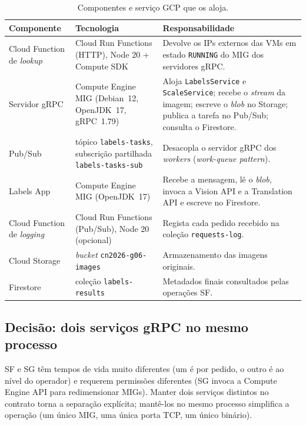 \documentclass[11pt,a4paper]{article}
\begin{document}
\begin{table}[h]
\centering
\small
\begin{tabular}{@{}p{36mm}p{40mm}p{70mm}@{}}
\toprule
Componente & Tecnologia & Responsabilidade \\
\midrule
Cloud Function de \emph{lookup}    & Cloud Run Functions (HTTP), Node 20 + Compute SDK & Devolve os IPs externos das VMs em estado \texttt{RUNNING} do MIG dos servidores gRPC. \\
Servidor gRPC                      & Compute Engine MIG (Debian~12, OpenJDK~17, gRPC~1.79) & Aloja \texttt{LabelsService} e \texttt{ScaleService}; recebe o \emph{stream} da imagem; escreve o \emph{blob} no Storage; publica a tarefa no Pub/Sub; consulta o Firestore. \\
Pub/Sub                            & t\'opico \texttt{labels-tasks}, subscri\c{c}\~ao partilhada \texttt{labels-tasks-sub} & Desacopla o servidor gRPC dos \emph{workers} (\emph{work-queue pattern}). \\
Labels App                         & Compute Engine MIG (OpenJDK~17) & Recebe a mensagem, l\^e o \emph{blob}, invoca a Vision API e a Translation API e escreve no Firestore. \\
Cloud Function de \emph{logging}   & Cloud Run Functions (Pub/Sub), Node 20 (opcional) & Regista cada pedido recebido na cole\c{c}\~ao \texttt{requests-log}. \\
Cloud Storage                      & \emph{bucket} \texttt{cn2026-g06-images} & Armazenamento das imagens originais. \\
Firestore                          & cole\c{c}\~ao \texttt{labels-results} & Metadados finais consultados pelas opera\c{c}\~oes SF. \\
\bottomrule
\end{tabular}
\caption{Componentes e servi\c{c}o GCP que os aloja.}
\end{table}

\subsection{Decis\~ao: dois servi\c{c}os gRPC no mesmo processo}
SF e SG t\^em tempos de vida muito diferentes (um \'e por pedido, o outro
\'e ao n\'ivel do operador) e requerem permiss\~oes diferentes (SG invoca a
Compute Engine API para redimensionar MIGs). Manter dois servi\c{c}os
distintos no contrato torna a separa\c{c}\~ao expl\'icita; mant\^e-los no
mesmo processo simplifica a opera\c{c}\~ao (um \'unico MIG, uma \'unica porta
TCP, um \'unico bin\'ario).
\end{document}
